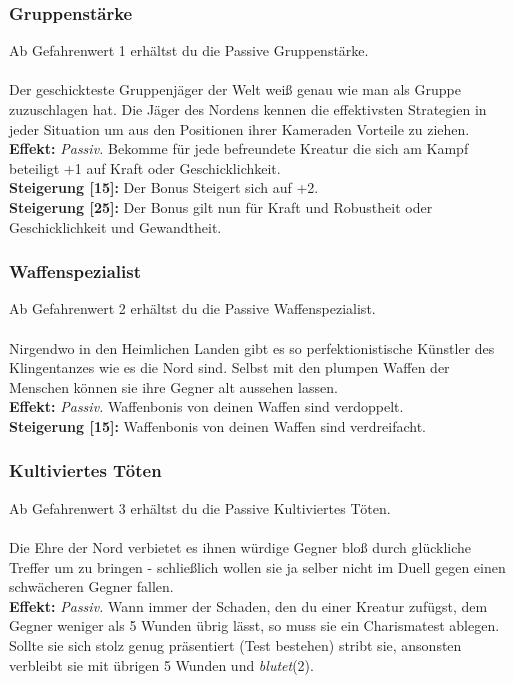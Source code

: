 \subsubsection*{ Gruppenstärke} \label{sk:gruppenstärke}
Ab Gefahrenwert 1 erhältst du die Passive Gruppenstärke.\\
\\
Der geschickteste Gruppenjäger der Welt weiß genau wie man als Gruppe zuzuschlagen hat. Die Jäger des Nordens kennen die effektivsten Strategien in jeder Situation um aus den Positionen ihrer Kameraden Vorteile zu ziehen. \\
\textbf{Effekt:} \textit{Passiv.} Bekomme für jede befreundete Kreatur die sich am Kampf beteiligt +1 auf Kraft oder Geschicklichkeit. \\
\textbf{Steigerung [15]:} Der Bonus Steigert sich auf +2.\\
\textbf{Steigerung [25]:} Der Bonus gilt nun für Kraft und Robustheit oder Geschicklichkeit und Gewandtheit.

\subsubsection*{ Waffenspezialist} \label{sk:waffenspezialist}
Ab Gefahrenwert 2 erhältst du die Passive Waffenspezialist.\\
\\
Nirgendwo in den Heimlichen Landen gibt es so perfektionistische Künstler des Klingentanzes wie es die Nord sind. Selbst mit den plumpen Waffen der Menschen können sie ihre Gegner alt aussehen lassen. \\
\textbf{Effekt:} \textit{Passiv.} Waffenbonis von deinen Waffen sind verdoppelt.\\
\textbf{Steigerung [15]:} Waffenbonis von deinen Waffen sind verdreifacht.

\subsubsection*{ Kultiviertes Töten} \label{sk:kultiviertes_töten}
Ab Gefahrenwert 3 erhältst du die Passive Kultiviertes Töten.\\
\\
Die Ehre der Nord verbietet es ihnen würdige Gegner bloß durch glückliche Treffer um zu bringen - schließlich wollen sie ja selber nicht im Duell gegen einen schwächeren Gegner fallen.\\
\textbf{Effekt:} \textit{Passiv.} Wann immer der Schaden, den du einer Kreatur zufügst, dem Gegner weniger als 5 Wunden übrig lässt, so muss sie ein Charismatest ablegen. Sollte sie sich stolz genug präsentiert (Test bestehen) stribt sie, ansonsten verbleibt sie mit übrigen 5 Wunden und \textit{blutet}(2).

